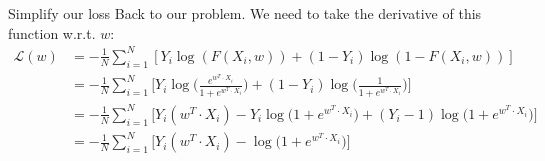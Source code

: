 \bgroup
\begin{frame}{Simplify our loss}
Back to our problem. We need to take the derivative of this function w.r.t. $w$:
\begin{align*}
\mathcal{L}(w) &= -\frac{1}{N} \sum_{i=1}^N [Y_i \log(F(X_i, w)) + (1 - Y_i)\log(1-F(X_i, w))]\\
&=- \frac{1}{N} \sum_{i=1}^N \bigg[Y_i \log\bigg(\frac{e^{w^T\cdot X_i}}{1+e^{w^T\cdot X_i}}\bigg) + (1 - Y_i)\log\bigg(\frac{1}{1+e^{w^T\cdot X_i}}\bigg)\bigg]\\
&=- \frac{1}{N} \sum_{i=1}^N \bigg[Y_i(w^T\cdot X_i) - Y_i\log\bigg(1+e^{w^T\cdot X_i}\bigg) + (Y_i - 1)\log\bigg(1+e^{w^T\cdot X_i}\bigg)\bigg]\\
&=- \frac{1}{N} \sum_{i=1}^N \bigg[Y_i(w^T\cdot X_i) - \log\bigg(1+e^{w^T\cdot X_i}\bigg)\bigg]\\
\end{align*}
\end{frame}
\egroup